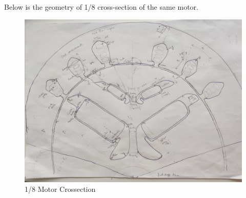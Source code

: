 \documentclass{report} %
\begin{document}
Below is the geometry of 1/8 cross-section of the same motor.

\begin{figure}[H]
    \centering
    \includegraphics[width=1\textwidth]{./ReportImages/EMCrosssection.jpg} 
    \caption{1/8 Motor Crossection}
    \label{fig:1/8 Motor Crossection}
\end{figure}

\newpage 
\end{document}
